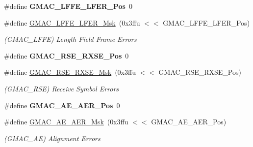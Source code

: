 \begin{DoxyCompactItemize}
\mbox{\label{group__SAMV71__GMAC_gab491d038b6a17e1df1894d7a346dba12}} 
\#define {\bfseries G\+M\+A\+C\+\_\+\+L\+F\+F\+E\+\_\+\+L\+F\+E\+R\+\_\+\+Pos}~0
\item 
\mbox{\label{group__SAMV71__GMAC_gacc161400a5c05623b0f2e21c34904380}} 
\#define \mbox{\hyperlink{group__SAMV71__GMAC_gacc161400a5c05623b0f2e21c34904380}{G\+M\+A\+C\+\_\+\+L\+F\+F\+E\+\_\+\+L\+F\+E\+R\+\_\+\+Msk}}~(0x3ffu $<$$<$ G\+M\+A\+C\+\_\+\+L\+F\+F\+E\+\_\+\+L\+F\+E\+R\+\_\+\+Pos)
\begin{DoxyCompactList}\small\item\em (G\+M\+A\+C\+\_\+\+L\+F\+FE) Length Field Frame Errors \end{DoxyCompactList}\item 
\mbox{\label{group__SAMV71__GMAC_gaaa7a1fbcab9386dcd9b37a7719c882fc}} 
\#define {\bfseries G\+M\+A\+C\+\_\+\+R\+S\+E\+\_\+\+R\+X\+S\+E\+\_\+\+Pos}~0
\item 
\mbox{\label{group__SAMV71__GMAC_ga8903707c8a2325c20c9ba29c036b0a3a}} 
\#define \mbox{\hyperlink{group__SAMV71__GMAC_ga8903707c8a2325c20c9ba29c036b0a3a}{G\+M\+A\+C\+\_\+\+R\+S\+E\+\_\+\+R\+X\+S\+E\+\_\+\+Msk}}~(0x3ffu $<$$<$ G\+M\+A\+C\+\_\+\+R\+S\+E\+\_\+\+R\+X\+S\+E\+\_\+\+Pos)
\begin{DoxyCompactList}\small\item\em (G\+M\+A\+C\+\_\+\+R\+SE) Receive Symbol Errors \end{DoxyCompactList}\item 
\mbox{\label{group__SAMV71__GMAC_gac5771df40e3d085351c78b21ce0a65ba}} 
\#define {\bfseries G\+M\+A\+C\+\_\+\+A\+E\+\_\+\+A\+E\+R\+\_\+\+Pos}~0
\item 
\mbox{\label{group__SAMV71__GMAC_ga9497556190df8f17277d933e55535460}} 
\#define \mbox{\hyperlink{group__SAMV71__GMAC_ga9497556190df8f17277d933e55535460}{G\+M\+A\+C\+\_\+\+A\+E\+\_\+\+A\+E\+R\+\_\+\+Msk}}~(0x3ffu $<$$<$ G\+M\+A\+C\+\_\+\+A\+E\+\_\+\+A\+E\+R\+\_\+\+Pos)
\begin{DoxyCompactList}\small\item\em (G\+M\+A\+C\+\_\+\+AE) Alignment Errors \end{DoxyCompactList}\item 
$$
\end{DoxyCompactItemize}
